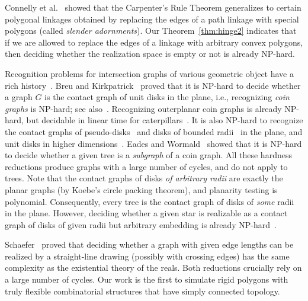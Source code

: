 \documentclass[10pt]{CSUNthesis}
\theoremstyle{plain}%
\theoremstyle{definition}
\theoremstyle{remark}
\begin{document}
Connelly et al.~\cite{CDD+10} showed that the Carpenter's Rule Theorem generalizes to certain polygonal linkages obtained by replacing the edges of a path linkage with special polygons (called \emph{slender adornments}). Our Theorem~\ref{thm:hinge2} indicates that if we are allowed to replace the edges of a linkage with arbitrary convex polygons, then deciding whether the realization space is empty or not is already NP-hard.

Recognition problems for intersection graphs of various geometric object have a rich history~\cite{HK01}.
Breu and Kirkpatrick~\cite{BK98} proved that it is NP-hard to decide whether a graph $G$ is the contact graph of unit disks in the plane, i.e., recognizing \emph{coin graphs} is NP-hard; see also~\cite{BET+99}. Recognizing outerplanar coin graphs is already NP-hard, but decidable in linear time for caterpillars~\cite{KNR15}. It is also NP-hard to recognize the contact graphs of pseudo-disks~\cite{HK01} and disks of bounded radii~\cite{BK95} in the plane, and unit disks in higher dimensions~\cite{Hli97,HK01}. Eades and Wormald~\cite{EW90} showed that it is NP-hard to decide whether a given tree is a \emph{subgraph} of a coin graph. All these hardness reductions produce graphs with a large number of cycles, and do not apply to trees. Note that the contact graphs of disks \emph{of arbitrary radii} are exactly the planar graphs (by Koebe's circle packing theorem), and planarity testing is polynomial. Consequently, every tree is the contact graph of disks of \emph{some} radii in the plane.
However, deciding whether a given star is realizable as a contact graph of disks of given radii but arbitrary embedding is already NP-hard~\cite{KNR15}.

Schaefer~\cite{Sch13} proved that deciding whether a graph with given edge lengths can be realized by a straight-line drawing (possibly with crossing edges) has the same complexity as the existential theory of the reals. Both reductions crucially rely on a large number of cycles. Our work is the first to simulate rigid polygons with truly flexible combinatorial structures that have simply connected topology.
\end{document}
